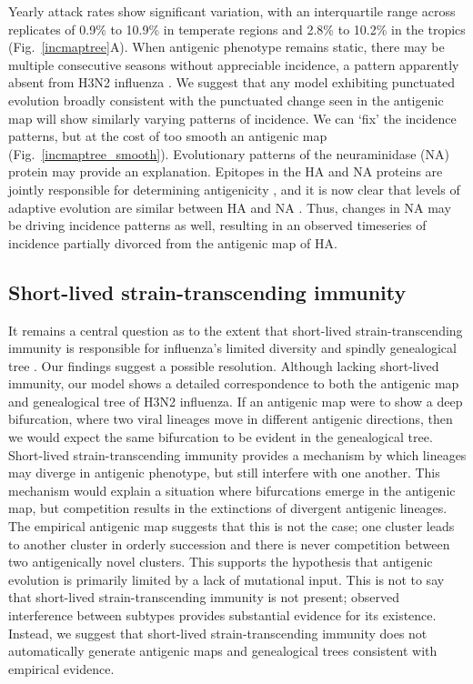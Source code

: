 Yearly attack rates show significant variation, with an interquartile range across replicates of 0.9\% to 10.9\% in temperate regions and 2.8\% to 10.2\% in the tropics (Fig.~\ref{incmaptree}A).  When antigenic phenotype remains static, there may be multiple consecutive seasons without appreciable incidence, a pattern apparently absent from H3N2 influenza \cite{Finkelman07}.  We suggest that any model exhibiting punctuated evolution broadly consistent with the punctuated change seen in the antigenic map will show similarly varying patterns of incidence.  We can `fix' the incidence patterns, but at the cost of too smooth an antigenic map (Fig.~\ref{incmaptree_smooth}).  Evolutionary patterns of the neuraminidase (NA) protein may provide an explanation.  Epitopes in the HA and NA proteins are jointly responsible for determining antigenicity \cite{Nelson07NatRevGenet}, and it is now clear that levels of adaptive evolution are similar between HA and NA \cite{Bhatt11}.  Thus, changes in NA may be driving incidence patterns as well, resulting in an observed timeseries of incidence partially divorced from the antigenic map of HA.

\subsection*{Short-lived strain-transcending immunity}

It remains a central question as to the extent that short-lived strain-transcending immunity is responsible for influenza's limited diversity and spindly genealogical tree \cite{Ferguson03,Tria05}.  Our findings suggest a possible resolution.  Although lacking short-lived immunity, our model shows a detailed correspondence to both the antigenic map and genealogical tree of H3N2 influenza.  If an antigenic map were to show a deep bifurcation, where two viral lineages move in different antigenic directions, then we would expect the same bifurcation to be evident in the genealogical tree.  Short-lived strain-transcending immunity provides a mechanism by which lineages may diverge in antigenic phenotype, but still interfere with one another.  This mechanism would explain a situation where bifurcations emerge in the antigenic map, but competition results in the extinctions of divergent antigenic lineages.  The empirical antigenic map \cite{Smith04} suggests that this is not the case; one cluster leads to another cluster in orderly succession and there is never competition between two antigenically novel clusters.  This supports the hypothesis that antigenic evolution is primarily limited by a lack of mutational input.  This is not to say that short-lived strain-transcending immunity is not present; observed interference between subtypes \cite{Ferguson03,Goldstein11} provides substantial evidence for its existence.  Instead, we suggest that short-lived strain-transcending immunity does not automatically generate antigenic maps and genealogical trees consistent with empirical evidence.

